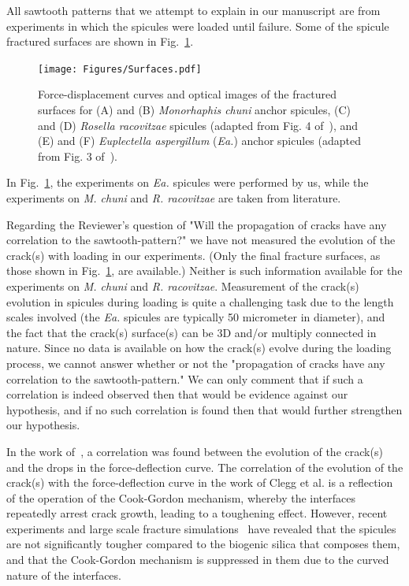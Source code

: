 \documentclass[11pt,letterpaper]{report}
\begin{document}
\begin{enumerate}[label=\textit{1.\arabic*},wide, labelwidth=!, labelindent=0pt]
\begin{enumerate}[label=\textit{2.\arabic*},wide, labelindent=0pt]
All  sawtooth patterns that we attempt to explain in our manuscript are from experiments in which the spicules were loaded until failure. Some of the spicule
 fractured surfaces are shown in Fig.~\ref{fig:Surfaces}.

\begin{figure}[H]
\centering
\texttt{[image: Figures/Surfaces.pdf]}
\caption{Force-displacement curves and optical images of the fractured surfaces for (A) and (B) \textit{Monorhaphis chuni} anchor spicules, (C) and (D) \textit{Rosella racovitzae} spicules (adapted from Fig. 4 of~\citet{kochiyama2021sawtooth}), and (E) and (F) \textit{Euplectella aspergillum} (\textit{Ea.}) anchor spicules (adapted from Fig. 3 of~\citet{monn2017enhanced}).
}
\label{fig:Surfaces}
\end{figure}

In Fig.~\ref{fig:Surfaces}, the experiments on \textit{Ea.} spicules were performed by us, while the experiments on \textit{M. chuni} and \textit{R. racovitzae} are taken from literature.


Regarding the Reviewer's question of "Will the propagation of cracks have any correlation to the sawtooth-pattern?" we have not measured the evolution of the crack(s) with loading in our experiments. (Only the final fracture surfaces, as those shown in Fig.~\ref{fig:Surfaces}, are available.) Neither is such information available for the experiments on \textit{M. chuni} and \textit{R. racovitzae}. Measurement of the crack(s) evolution in spicules during loading is quite a challenging task due to the length scales involved (the \textit{Ea.} spicules are typically 50 micrometer in diameter), and the fact that the crack(s) surface(s) can be 3D and/or multiply connected in nature. Since no data is available on how the crack(s) evolve during the loading process, we cannot answer whether or not the "propagation of cracks have any correlation to the sawtooth-pattern." We can only comment that if such a correlation is indeed observed then that would be evidence against our hypothesis, and if no such correlation is found then that would further strengthen our hypothesis.

In the work of~\citet{clegg1990simple}, a correlation was found between the evolution of the crack(s) and the drops in the force-deflection curve. The correlation of the evolution of the crack(s) with the force-deflection curve in the work of Clegg et al. is a reflection of the operation of the Cook-Gordon mechanism, whereby the interfaces repeatedly arrest crack growth, leading to a toughening effect. However, recent experiments and large scale fracture simulations~\citep{monn2020lamellar} have revealed that the spicules are not significantly tougher compared to the biogenic silica that composes them, and that the Cook-Gordon mechanism is suppressed in them due to the curved nature of the interfaces.


\end{enumerate}
\end{enumerate}
\end{document}
